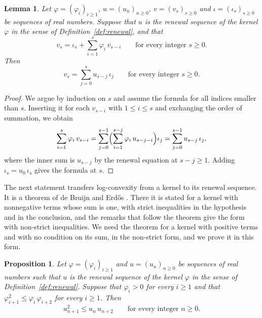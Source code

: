 \documentclass{amsart}
\newtheorem{proposition}[theorem]{Proposition}
\newtheorem{lemma}[theorem]{Lemma}
\theoremstyle{definition}
\theoremstyle{remark}
\numberwithin{equation}{section}
\begin{document}
\begin{lemma}\label{lem:convolutionform}
Let $\varphi=(\varphi_i)_{i\ge1}$, $u=(u_n)_{n\ge0}$, $v=(v_s)_{s\ge0}$ and
$\iota=(\iota_s)_{s\ge0}$ be sequences of real numbers. Suppose that $u$ is
the renewal sequence of the kernel $\varphi$ in the sense of
Definition~\ref{def:renewal}, and that
\[
v_s=\iota_s+\sum_{i=1}^{s}\varphi_i\,v_{s-i}
\qquad\text{for every integer } s\ge0 .
\]
Then
\[
v_s=\sum_{j=0}^{s}u_{s-j}\,\iota_j
\qquad\text{for every integer } s\ge0 .
\]
\end{lemma}

\begin{proof}
We argue by induction on $s$ and assume the formula for all indices smaller
than $s$. Inserting it for each $v_{s-i}$ with $1\le i\le s$ and exchanging
the order of summation, we obtain
\[
\sum_{i=1}^{s}\varphi_i\,v_{s-i}
=\sum_{j=0}^{s-1}\Bigl(\sum_{i=1}^{s-j}\varphi_i\,u_{s-j-i}\Bigr)\iota_j
=\sum_{j=0}^{s-1}u_{s-j}\,\iota_j ,
\]
where the inner sum is $u_{s-j}$ by the renewal equation at $s-j\ge1$. Adding
$\iota_s=u_0\,\iota_s$ gives the formula at $s$.
\end{proof}

The next statement transfers log-convexity from a kernel to its renewal
sequence. It is a theorem of de Bruijn and Erd\H{o}s
\cite[Theorem~1]{debruijn1953}. There it is stated for a kernel with
nonnegative terms whose sum is one, with strict inequalities in the
hypothesis and in the conclusion, and the remarks that follow the theorem
give the form with non-strict inequalities. We need the theorem for a kernel
with positive terms and with no condition on its sum, in the non-strict
form, and we prove it in this form.

\begin{proposition}\label{prop:renewalconvex}
Let $\varphi=(\varphi_i)_{i\ge1}$ and $u=(u_n)_{n\ge0}$ be sequences of real
numbers such that $u$ is the renewal sequence of the kernel $\varphi$ in the
sense of Definition~\ref{def:renewal}. Suppose that $\varphi_i>0$ for every
$i\ge1$ and that $\varphi_{i+1}^2\le\varphi_i\,\varphi_{i+2}$ for every
$i\ge1$. Then
\[
u_{n+1}^2\le u_n\,u_{n+2}\qquad\text{for every integer } n\ge0 .
\]
\end{proposition}
\end{document}
